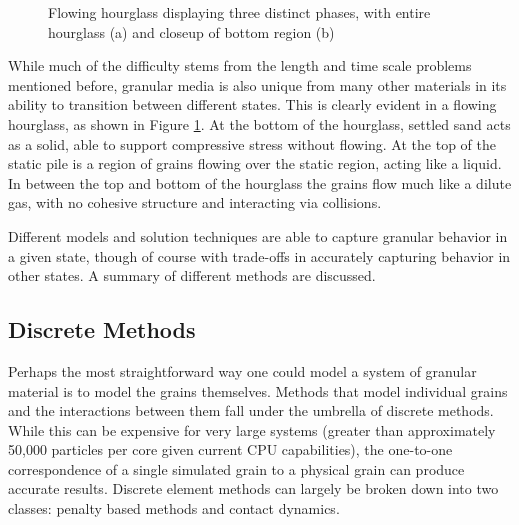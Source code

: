 \begin{figure}[htp] 
    \centering
    \hfill%
    \caption{Flowing hourglass displaying three distinct phases, with entire hourglass 			(a) and closeup of bottom region (b)}
    \label{hourglass}
\end{figure}

While much of the difficulty stems from the length and time scale problems mentioned before, granular media is also unique from many other materials in its ability to transition between different states. This is clearly evident in a flowing hourglass, as shown in Figure \ref{hourglass}. At the bottom of the hourglass, settled sand acts as a solid, able to support compressive stress without flowing. At the top of the static pile is a region of grains flowing over the static region, acting like a liquid. In between the top and bottom of the hourglass the grains flow much like a dilute gas, with no cohesive structure and interacting via collisions.

Different models and solution techniques are able to capture granular behavior in a given state, though of course with trade-offs in accurately capturing behavior in other states. A summary of different methods are discussed. 

\subsection{Discrete Methods}
Perhaps the most straightforward way one could model a system of granular material is to model the grains themselves. Methods that model individual grains and the interactions between them fall under the umbrella of discrete methods. While this can be expensive for very large systems (greater than approximately 50,000 particles per core given current CPU capabilities), the one-to-one correspondence of a single simulated grain to a physical grain can produce accurate results. Discrete element methods can largely be broken down into two classes: penalty based methods and contact dynamics.

